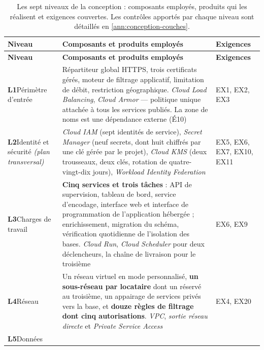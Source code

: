 \begin{longtable}{|P{2.0cm}|P{11.0cm}|P{1.9cm}|}
\caption[Les sept niveaux : composants et exigences couvertes]{Les sept niveaux de la conception :
composants employés, produits qui les réalisent et exigences couvertes. Les contrôles apportés par
chaque niveau sont détaillés en \cref{ann:conception-couches}.}
\label{tab:conception-couches-synthese} \\
\hline
\textbf{Niveau} & \textbf{Composants et produits employés} & \textbf{Exigences} \\
\hline
\endfirsthead
\hline
\textbf{Niveau} & \textbf{Composants et produits employés} & \textbf{Exigences} \\
\hline
\endhead
\textbf{L1}\newline Périmètre d'entrée &
Répartiteur global HTTPS, trois certificats gérés, moteur de filtrage applicatif, limitation de
débit, restriction géographique. \emph{Cloud Load Balancing}, \emph{Cloud Armor} --- politique
unique attachée à tous les services publiés. La zone de noms est une dépendance externe (É10) &
EX1, EX2, EX3 \\ \hline
\textbf{L2}\newline Identité et sécurité \emph{(plan transversal)} &
\emph{Cloud IAM} (sept identités de service), \emph{Secret Manager} (neuf secrets, dont huit
chiffrés par une clé gérée par le projet), \emph{Cloud KMS} (deux trousseaux, deux clés, rotation
de quatre-vingt-dix jours), \emph{Workload Identity Federation} &
EX5, EX6, EX7, EX10, EX11 \\ \hline
\textbf{L3}\newline Charges de travail &
\textbf{Cinq services et trois tâches} : API de supervision, tableau de bord, service d'encodage,
interface web et interface de programmation de l'application hébergée ; enrichissement, migration
du schéma, vérification quotidienne de l'isolation des bases. \emph{Cloud Run}, \emph{Cloud
Scheduler} pour deux déclencheurs, la chaîne de livraison pour le troisième &
EX6, EX9 \\ \hline
\textbf{L4}\newline Réseau &
Un réseau virtuel en mode personnalisé, \textbf{un sous-réseau par locataire} dont un réservé au
troisième, un appairage de services privés vers la base, et \textbf{douze règles de filtrage dont
cinq autorisations}. \emph{VPC}, \emph{sortie réseau directe} et \emph{Private Service Access} &
EX4, EX20 \\ \hline
\textbf{L5}\newline Données &

\end{longtable}
